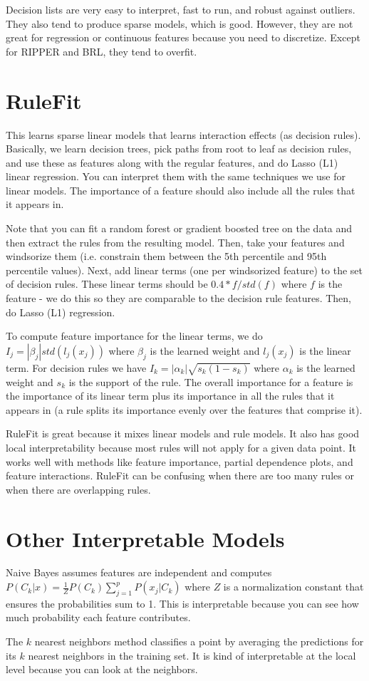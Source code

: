 \documentclass[a4paper]{article}
\begin{document}
Decision lists are very easy to interpret, fast to run, and robust against
outliers. They also tend to produce sparse models, which is good. However, they
are not great for regression or continuous features because you need to
discretize. Except for RIPPER and BRL, they tend to overfit.

\section{RuleFit}
This learns sparse linear models that learns interaction effects (as decision
rules). Basically, we learn decision trees, pick paths from root to leaf as
decision rules, and use these as features along with
the regular features, and do Lasso (L1) linear regression. You can interpret them
with the same techniques we use for linear models. The importance of a feature
should also include all the rules that it appears in.

Note that you can fit a
random forest or gradient boosted tree on the data and then extract the
rules from the resulting model. Then, take your features and windsorize them
(i.e. constrain them between the 5th percentile and 95th percentile values).
Next, add linear terms (one per windsorized feature) to the set of
decision rules. These linear terms should be $0.4 * f / std(f)$ where $f$
is the feature - we do this so they are comparable to the decision rule
features. Then, do Lasso (L1) regression.

To compute feature importance for the linear terms, we do $I_j = |\beta_j| std(
l_j(x_j))$ where $\beta_j$ is the learned weight and $l_j(x_j)$ is the linear
term. For decision rules we have
$I_k = |\alpha_k| \sqrt{s_k (1 - s_k)}$ where $\alpha_k$ is the learned weight
and $s_k$ is the support of the rule. The overall importance for a feature is
the importance of its linear term plus its importance in all the rules that it
appears in (a rule splits its importance evenly over the features that
comprise it).

RuleFit is great because it mixes linear models and rule models. It also has
good local interpretability because most rules will not apply for a given data
point. It works well with methods like feature importance, partial dependence
plots, and feature interactions. RuleFit can be confusing when there are too
many rules or when there are overlapping rules.

\section{Other Interpretable Models}
Naive Bayes assumes features are independent and computes $P(C_k | x) = \frac{1
}{Z} P(C_k) \sum_{j=1}^{p}{P(x_j | C_k)}$ where $Z$ is a normalization constant
that ensures the probabilities sum to 1. This is interpretable because you can
see how much probability each feature contributes.

The $k$ nearest neighbors method classifies a point by averaging the predictions
for its $k$ nearest neighbors in the training set. It is kind of interpretable
at the local level because you can look at the neighbors.
\end{document}
